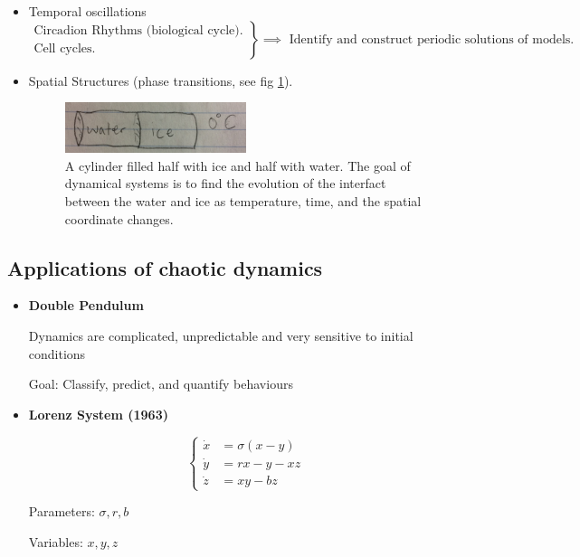\documentclass[main.tex]{subfiles}
\begin{document}
\begin{itemize}
    \item
    Temporal oscillations
    \[\left.
    \begin{array}{lr}
        \text{Circadion Rhythms (biological cycle).} \\
        \text{Cell cycles.}
    \end{array}\right\} \implies\textrm{ Identify and construct periodic solutions of models.}\]
    \item
    Spatial Structures (phase transitions, see fig \ref{fig:phase-transition}).
        \begin{figure}[ht]
        \centering
        \includegraphics[width=0.5\textwidth]{phase-transition}
        \caption{A cylinder filled half with ice and half with water. The goal of dynamical systems is to find the evolution of the interfact between the water and ice as temperature, time, and the spatial coordinate changes.}
\label{fig:phase-transition}
\end{figure}
\end{itemize}

\subsection{Applications of chaotic dynamics}
\begin{itemize}
    \item \textbf{Double Pendulum}

    Dynamics are complicated, unpredictable and very sensitive to initial conditions

    Goal: Classify, predict, and quantify behaviours

    \item \textbf{Lorenz System (1963)}

    \begin{equation*}
    \label{eq:Lorenz-System}
        \begin{cases}
            \dot{x} &= \sigma(x-y) \\
            \dot{y} &= rx - y - xz \\
            \dot{z} &= xy - bz
        \end{cases}
    \end{equation*}

    Parameters: $\sigma, r, b$

    Variables: $x, y, z$

\end{itemize}
\end{document}

